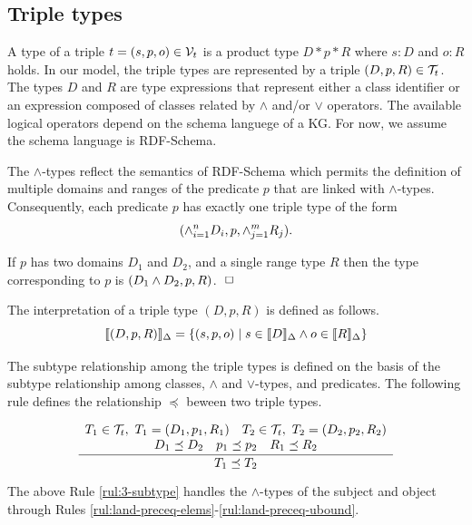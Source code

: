 \documentclass[runningheads]{llncs}
\newcommand{\llb}{\llbracket}
\newcommand{\rrb}{\rrbracket}
\newcommand{\V}{{\cal V}}
\newcommand{\TT}{{\cal T}}
\newcommand{\finbox}{\phantom{.}\hfill\Box}
\begin{document}
\subsection{Triple types\label{sec:3-types}}

A type of a triple $t=(s,p,o)\in\V_t$ is a product type $D*p*R$
where $s:D$ and $o:R$ holds. In our model, the triple types are
represented by a triple $(D,p,R)\in\TT_t$. The types $D$ and $R$ are
type expressions that represent either a class identifier or an 
expression composed of classes related by $\land$ and/or $\lor$
operators. The available logical operators depend on the schema
languege of a KG. For now, we assume the schema language is
RDF-Schema.

The $\land$-types reflect the semantics of RDF-Schema \cite{rdfschema}
which permits the definition of multiple domains and ranges of the
predicate $p$ that are linked with $\land$-types. Consequently, each
predicate $p$ has exactly one triple type of the form
$$(\land_{i=1}^n\/D_i, p ,\land_{j=1}^m\/R_j).$$

\begin{example}
  If $p$ has two domains $D_1$ and $D_2$, and a single
range type $R$ then the type corresponding to $p$ is
$(D_1\land\/D_2,p,R)$. $\finbox$
\end{example}

\noindent
The interpretation of a triple type $(D,p,R)$ is defined as
follows.
$$\llb(D,p,R)\rrb_\Delta=\{(s,p,o)\mid\/s\in\llb\/D\rrb_\Delta\land\/o\in\llb\/R\rrb_\Delta \}$$

The subtype relationship among the triple types is defined on the
basis of the subtype relationship among classes, $\land$ and
$\lor$-types, and predicates. The following rule defines the
relationship $\preceq$ beween two triple types.

\begin{equation}
\label{rul:3-subtype}
\dfrac{\begin{array}{c}
       T_1\in\TT_t,\ T_1=(D_1,p_1,R_1)\quad T_2\in\TT_t,\ T_2=(D_2,p_2,R_2) \\
       D_1\preceq\/D_2\quad\/p_1\preceq\/p_2\quad\/R_1\preceq\/R_2
       \end{array}}
      {T_1\preceq\/T_2}
\end{equation}

\noindent
The above Rule \ref{rul:3-subtype} handles the $\land$-types of the
subject and object through Rules
\ref{rul:land-preceq-elems}-\ref{rul:land-preceq-ubound}.
\end{document}
